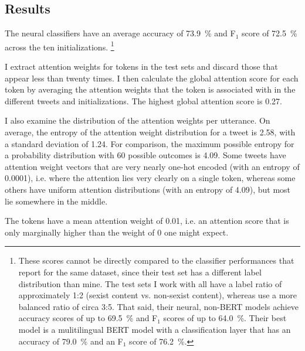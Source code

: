 \subsection{Results}
\label{sec:tweets-attn-results}

The neural classifiers have an average accuracy of 73.9~\% and F$_1$ score of 72.5~\% across the ten initializations.%
\footnote{These scores cannot be directly compared to the classifier performances that \citet{chiril2020annotated} report for the same dataset, since their test set has a different label distribution than mine.
The test sets I work with all have a label ratio of approximately 1:2 (sexist content vs. non-sexist content), whereas \citeauthor{chiril2020annotated} use a more balanced ratio of circa 3:5.
That said, their neural, non-BERT models achieve accuracy scores of up to 69.5~\% and F$_1$ scores of up to 64.0~\%.
Their best model is a mulitilingual BERT model \citep{devlin2019bert} with a classification layer that has an accuracy of 79.0~\% and an F$_1$ score of 76.2~\%.}

I extract attention weights for tokens in the test sets and discard those that appear less than twenty times.
I then calculate the global attention score for each token by averaging the attention weights that the token is associated with in the different tweets and initializations.
The highest global attention score is 0.27.

I also examine the distribution of the attention weights per utterance.
On average, the entropy of the attention weight distribution for a tweet is 2.58, with a standard deviation of 1.24.
For comparison, the maximum possible entropy for a probability distribution with 60 possible outcomes is 4.09.
Some tweets have attention weight vectors that are very nearly one-hot encoded (with an entropy of 0.0001), i.e. where the attention lies very clearly on a single token, whereas some others have uniform attention distributions (with an entropy of 4.09), but most lie somewhere in the middle.

The {\ngram\filler} tokens have a mean attention weight of 0.01, i.e. an attention score that is only marginally higher than the weight of 0 one might expect.


